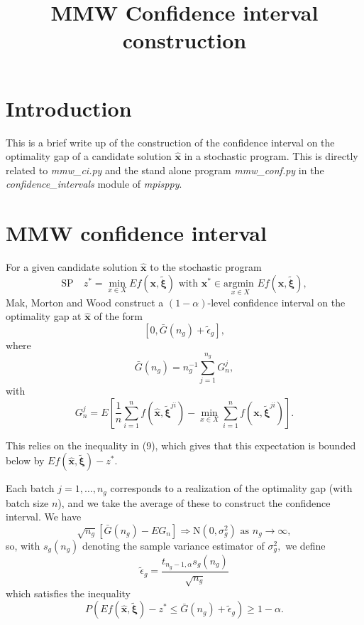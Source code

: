 \documentclass[11pt]{article}
\title {MMW Confidence interval construction}
\begin{document}
\section{Introduction}

This is a brief write up of the construction of the confidence interval on the optimality gap of a candidate solution $\mathbf{\hat{x}}$ in a stochastic program. This is directly related to \textit{mmw\_ci.py} and the stand alone program \textit{mmw\_conf.py} in the \textit{confidence\_intervals} module of \textit{mpisppy}.

\section{MMW confidence interval}
For a given candidate solution $\mathbf{\hat{x}}$ to the stochastic program
$$
	\text{SP} \quad z^* = \min_{x\in X} E f(\mathbf{x}, \mathbf{\tilde{\xi}}) \text{ with } \mathbf{x^*} \in \underset{x \in X}{\text{argmin }}Ef(\mathbf{x}, \mathbf{\tilde{\xi}}),
$$
Mak, Morton and Wood construct a $(1 - \alpha)$-level confidence interval on the optimality gap at $\mathbf{\hat{x}}$ of the form
$$
	[0, \bar{G}(n_g) + \tilde{\epsilon}_g],
$$
where 
$$
 \bar{G}(n_g) = n_g^{-1} \sum_{j=1}^{n_g} G_n^j,
$$
with 
$$
G_n^j = E\left[\frac{1}{n} \sum_{i=1}^n f(\hat{\mathbf{x}}, \mathbf{\tilde{\xi}}^{ji})  - \min_{x\in X}\sum_{i=1}^n f(\mathbf{x}, \mathbf{\tilde{\xi}}^{ji}) \right].
$$

This relies on the inequality in (9), which gives that this expectation is bounded below by $Ef(\mathbf{\hat{x}}, \mathbf{\tilde{\xi}}) - z^*.$

Each batch $j = 1, \dots, n_g$ corresponds to a realization of the optimality gap (with batch size $n$), and we take the average of these to construct the confidence interval. We have
$$
\sqrt{n_g} [\bar{G}(n_g) - EG_n] \Rightarrow \text{N}(0, \sigma_g^2) \text{ as } n_g \to \infty,
$$
so, with $s_g(n_g)$ denoting the sample variance estimator of $\sigma_g^2,$ we define
$$
	\tilde{\epsilon}_g = \frac{t_{n_g - 1, \alpha} s_g(n_g)}{\sqrt{n_g}}
$$
which satisfies the inequality
$$
P\left(E f(\mathbf{\hat{x}}, \mathbf{\tilde{\xi}}) - z^* \le \bar{G}(n_g) + \tilde{\epsilon}_g\right) \ge 1 - \alpha.
$$
\end{document}
